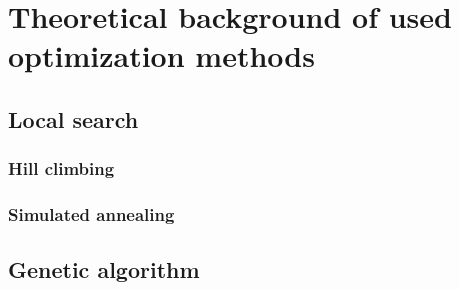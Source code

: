 \chapter{Theoretical background of used optimization methods}

\section{Local search}

\subsection{Hill climbing}

\subsection{Simulated annealing}

\section{Genetic algorithm}
